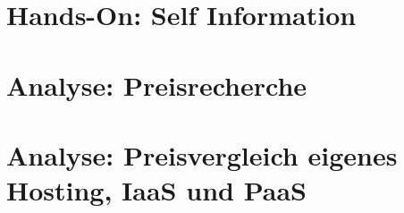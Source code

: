 \documentclass[12pt,a4paper]{article}
\begin{document}
\section{Hands-On: Self Information}

\section{Analyse: Preisrecherche}

\section{Analyse: Preisvergleich eigenes Hosting, IaaS und PaaS}
\end{document}
